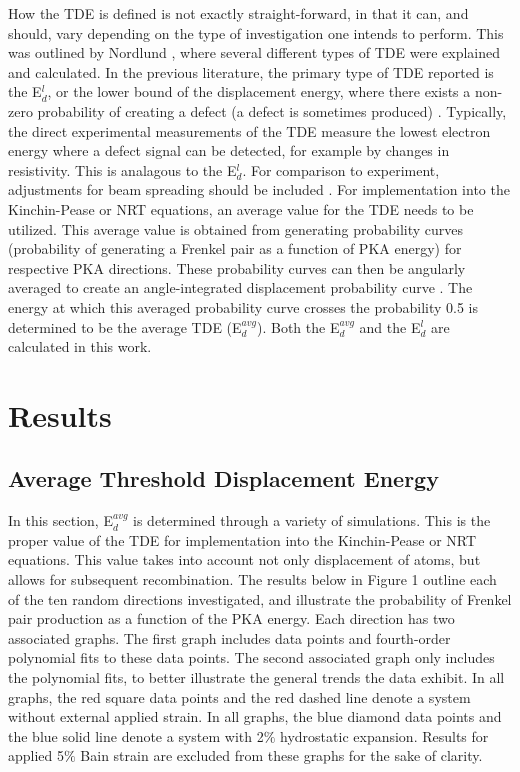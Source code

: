\documentclass[review]{elsarticle}
\begin{document}
How the TDE is defined is not exactly straight-forward, in that it can, and should, vary depending on the type of investigation one intends to perform.  This was outlined by Nordlund \cite{nordlund2006}, where several different types of TDE were explained and calculated.  In the previous literature, the primary type of TDE reported is the E$^{l}_{d}$, or the lower bound of the displacement energy, where there exists a non-zero probability of creating a defect (a defect is sometimes produced) \cite{malerba2002}.  Typically, the direct experimental measurements of the TDE measure the lowest electron energy where a defect signal can be detected, for example by changes in resistivity.  This is analagous to the E$^{l}_{d}$.  For comparison to experiment, adjustments for beam spreading should be included \cite{nordlund2006}.  For implementation into the Kinchin-Pease or NRT equations, an average value for the TDE needs to be utilized.  This average value is obtained from generating probability curves (probability of generating a Frenkel pair as a function of PKA energy) for respective PKA directions.  These probability curves can then be angularly averaged to create an angle-integrated displacement probability curve \cite{nordlund2006}.  The energy at which this averaged probability curve crosses the probability 0.5 is determined to be the average TDE (E$^{avg}_{d}$).  Both the E$^{avg}_{d}$ and the E$^{l}_{d}$ are calculated in this work.


\section{Results}
\subsection{Average Threshold Displacement Energy}
In this section, E$^{avg}_{d}$ is determined through a variety of simulations.  This is the proper value of the TDE for implementation into the Kinchin-Pease or NRT equations.  This value takes into account not only displacement of atoms, but allows for subsequent recombination.  The results below in Figure 1 outline each of the ten random directions investigated, and illustrate the probability of Frenkel pair production as a function of the PKA energy.  Each direction has two associated graphs.  The first graph includes data points and fourth-order polynomial fits to these data points.  The second associated graph only includes the polynomial fits, to better illustrate the general trends the data exhibit.  In all graphs, the red square data points and the red dashed line denote a system without external applied strain.  In all graphs, the blue diamond data points and the blue solid line denote a system with 2$\%$ hydrostatic expansion.  Results for applied 5$\%$ Bain strain are excluded from these graphs for the sake of clarity.
\end{document}
